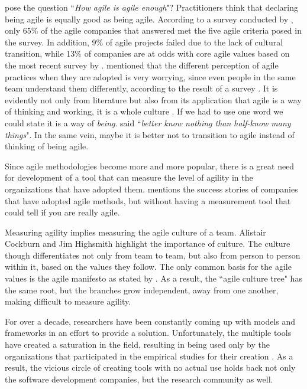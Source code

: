\citet{comparative_agility} pose the question ``\textit{How agile is agile enough}"? Practitioners think that declaring being agile is equally good as being agile. According to a survey conducted by \citet{ambysoft}, only 65\% of the agile companies that answered met the five agile criteria posed in the survey. In addition, 9\% of agile projects failed due to the lack of cultural transition, while 13\% of companies are at odds with core agile values based on the most recent survey by \citet{versionOne}. \citet{poonacha} mentioned that the different perception of agile practices when they are adopted is very worrying, since even people in the same team understand them differently, according to the result of a survey \cite{ambler}. It is evidently not only from literature but also from its application that agile is a way of thinking and working, it is a whole culture \cite{poonacha}. If we had to use one word we could state it is a way of \textit{being}. \citet{Nietzsche} said ``\textit{better know nothing than half-know many things}". In the same vein, maybe it is better not to transition to agile instead of thinking of being agile. 

Since agile methodologies become more and more popular, there is a great need for development of a tool that can measure the level of agility in the organizations that have adopted them. \citet{sidky} mentions the success stories of companies that have adopted agile methods, but without having a measurement tool that could tell if you are really agile. 

Measuring agility implies measuring the agile culture of a team. Alistair Cockburn \cite{cockburn2002agile, Cockburn-poetry} and Jim Highsmith \cite{Highsmith:2002} highlight the importance of culture. The culture though differentiates not only from team to team, but also from person to person within it, based on the values they follow. The only common basis for the agile values is the agile manifesto\cite{beck2001agile} as stated by \citet{Ingalls}. As a result, the ``agile culture tree" has the same root, but the branches grow independent, away from one another, making difficult to measure agility.

For over a decade, researchers have been constantly coming up with models and frameworks in an effort to provide a solution. Unfortunately, the multiple tools have created a saturation in the field, resulting in being used only by the organizations that participated in the empirical studies for their creation \cite{samireh_jalali_dissertation, jalali_angelis}. As a result, the vicious circle of creating tools with no actual use holds back not only the software development companies, but the research community as well.

